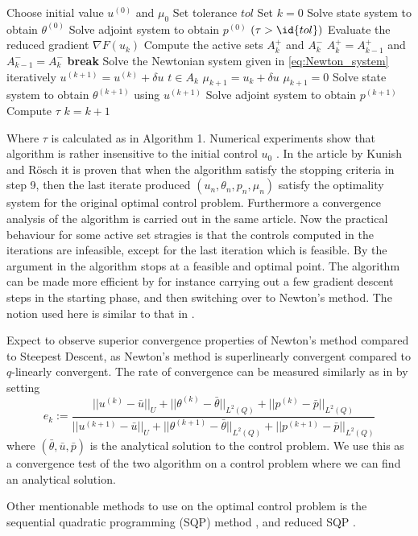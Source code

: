 \begin{codebox}
\li Choose initial value $u^{(0)}$ and $\mu_0$ 
\li Set tolerance $tol$
\li Set $k = 0$
\li Solve state system to obtain $\theta^{(0)}$
\li Solve adjoint system to obtain $p^{(0)}$
\li \While $(\tau > \id{tol})$ \Then 
\li Evaluate the reduced gradient $\nabla F(u_k)$
\li Compute the active sets $A_k^{+}$ and $A_k^{-}$
\li \If $A_k^{+} = A_{k-1}^{+}$ and $A_{k-1}^{-} = A_k^{-}$ \Then 
\li \textbf{break} \End
\li Solve the Newtonian system given in \eqref{eq:Newton_system} iteratively
\li $u^{(k+1)} = u^{(k)} + \delta u$  
\li \If $t \in A_k$ \Then
    \li $\mu_{k+1} = u_k + \delta u$
    \li \Else $\mu_{k+1} = 0$ 
    \End
\li Solve state system to obtain $\theta^{(k+1)}$ using $u^{(k+1)}$
\li Solve adjoint system to obtain $p^{(k+1)}$ 
\li Compute $\tau$
\li $k = k+1$
\end{codebox}

Where $\tau$ is calculated as in Algorithm 1.  Numerical experiments show that algorithm is rather insensitive to the initial control $u_0$  \cite{primal_dual}. In the article by Kunish and Rösch \cite{primal_dual} it is proven that when the algorithm satisfy the stopping criteria in step 9, then the last iterate produced $(u_n, \theta_n, p_n, \mu_n)$ satisfy the optimality system for the original optimal control problem. Furthermore a convergence analysis of the algorithm is carried out in the same article. Now the practical behaviour for some active set stragies is that the controls computed in the iterations are infeasible, except for the last iteration which is feasible. By the argument in \cite{primal_dual} the algorithm stops at a feasible and optimal point. The algorithm can be made more efficient by for instance carrying out a few gradient descent steps in the starting phase, and then switching over to Newton's method. The notion used here is similar to that in \cite{Algorithms}. \bigskip

Expect to observe superior convergence properties of Newton's method compared to Steepest Descent, as Newton's method is superlinearly convergent compared to $q$-linearly convergent. The rate of convergence can be measured similarly as in \cite{DPSteel} by setting 
\begin{equation}
    \label{eq:rate_of_conv}
    e_k := \frac{||u^{(k)}-\bar{u}||_U + ||\theta^{(k)}-\bar{\theta}||_{L^2(Q)} +||p^{(k)}-\bar{p}||_{L^2(Q)} }{||u^{(k+1)}-\bar{u}||_U + ||\theta^{(k+1)}-\bar{\theta}||_{L^2(Q)} +||p^{(k+1)}-\bar{p}||_{L^2(Q)}}
\end{equation}
where $(\bar{\theta},\bar{u},\bar{p})$ is the analytical solution to the control problem. We use this as a convergence test of the two algorithm on a control problem where we can find an analytical solution. 

Other mentionable methods to use on the optimal control problem is the sequential quadratic programming (SQP) method \cite{Algorithms}, and reduced SQP \cite{DPSteel}. 
